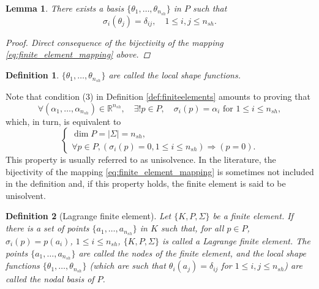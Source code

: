 \documentclass{article}
\newtheorem{definition}{Definition}
\newtheorem{lemma}{Lemma}
\begin{document}
\begin{lemma}\label{lemma:basis_from_bijectivity}
    There exists a basis $\{\theta_1, \dots, \theta_{n_{sh}}\}$ in $P$ such that
    $$ \sigma_i(\theta_j) = \delta_{ij}, \quad 1 \le i,j \le n_{sh}. $$
    \begin{proof}
        Direct consequence of the bijectivity of the mapping \eqref{eq:finite_element_mapping} above.
    \end{proof}
\end{lemma}


\begin{definition}
    $\{\theta_1, \dots, \theta_{n_{sh}}\}$ are called the local shape functions.
\end{definition}

Note that condition (3) in Definition \ref{def:finiteelements} amounts to proving that
    $$ \forall(\alpha_1, \dots, \alpha_{n_{sh}}) \in \mathbb{R}^{n_{sh}}, \quad \exists ! p \in P, \quad \sigma_i(p) = \alpha_i \text{ for } 1 \le i \le n_{sh}, $$
    which, in turn, is equivalent to
    $$ \begin{cases} \dim P = |\Sigma| = n_{sh}, \\ \forall p \in P, (\sigma_i(p) = 0, 1 \le i \le n_{sh}) \Rightarrow (p = 0). \end{cases} $$
This property is usually referred to as unisolvence. In the literature, the bijectivity of the mapping \eqref{eq:finite_element_mapping} is sometimes not included in the definition and, if this property holds, the finite element is said to be unisolvent.

\begin{definition}[Lagrange finite element]\label{def:lagrange_finite_element}
    Let $\{K, P, \Sigma\}$ be a finite element. If there is a set of points $\{a_1, \dots, a_{n_{sh}}\}$ in $K$ such that, for all $p \in P$, $\sigma_i(p) = p(a_i)$, $1 \le i \le n_{sh}$, $\{K, P, \Sigma\}$ is called a Lagrange finite element. The points $\{a_1, \dots, a_{n_{sh}}\}$ are called the nodes of the finite element, and the local shape functions $\{\theta_1, \dots, \theta_{n_{sh}}\}$ (which are such that $\theta_i(a_j) = \delta_{ij}$ for $1 \le i,j \le n_{sh}$) are called the nodal basis of $P$.
\end{definition}
\end{document}
